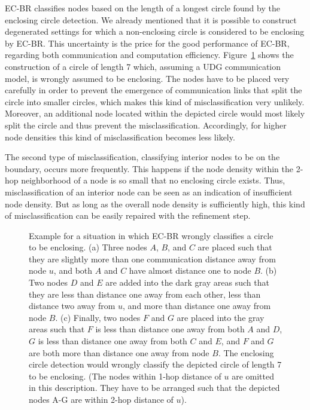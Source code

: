 \documentclass{llncs}
\begin{document}
EC-BR classifies nodes based on the length of a longest circle found by the enclosing circle detection.
We already mentioned that it is possible to construct degenerated settings for which a non-enclosing circle is considered to be enclosing by EC-BR.
This uncertainty is the price for the good performance of EC-BR, regarding both communication and computation efficiency.
Figure~\ref{fig:ecbr_guarantee} shows the construction of a circle of length 7 which, assuming a UDG communication model, is wrongly assumed to be enclosing. 
The nodes have to be placed very carefully in order to prevent the emergence of communication links that split the circle into smaller circles, which makes this kind of misclassification very unlikely.
Moreover, an additional node located within the depicted circle would most likely split the circle and thus prevent the misclassification.
Accordingly, for higher node densities this kind of misclassification becomes less likely.

The second type of misclassification, classifying interior nodes to be on the boundary, occurs more frequently. This happens if the node density within the 2-hop neighborhood of a node is so small that no enclosing circle exists. Thus, misclassification of an interior node can be seen as an indication of insufficient node density. 
But as long as the overall node density is sufficiently high, this kind of misclassification can be easily repaired with the refinement step.

\begin{figure}[t]
\centering
\hfill
{}
\hfill
{}
\hfill
{}
\hfill\hspace{0em}
\caption{
Example for a situation in which EC-BR wrongly classifies a circle to be enclosing. 
(a) Three nodes $A$, $B$, and $C$ are placed such that they are slightly more than one communication distance away from node $u$, and both $A$ and $C$ have almost distance one to node $B$.
(b) Two nodes $D$ and $E$ are added into the dark gray areas such that they are less than distance one away from each other, less than distance two away from $u$, and more than distance one away from node $B$.
(c) Finally, two nodes $F$ and $G$ are placed into the gray areas such that $F$ is less than distance one away from both $A$ and $D$, $G$ is less than distance one away from both $C$ and $E$, and $F$ and $G$ are both more than distance one away from node $B$. The enclosing circle detection would wrongly classify the depicted circle of length 7 to be enclosing. (The nodes within 1-hop distance of $u$ are omitted in this description. They have to be arranged such that the depicted nodes A-G are within 2-hop distance of $u$). 
}
\label{fig:ecbr_guarantee}
\end{figure}
\end{document}
